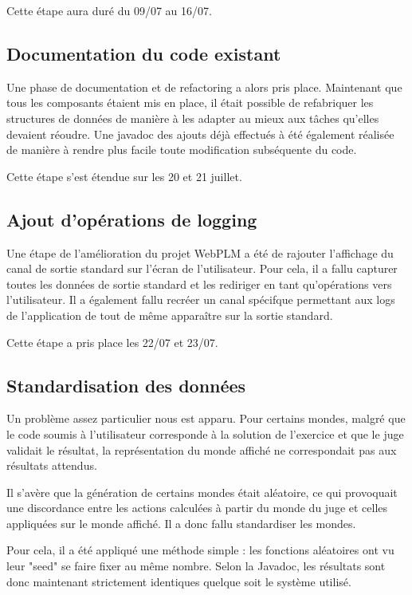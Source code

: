 \documentclass[stage]{tnreport}
\begin{document}
Cette étape aura duré du 09/07 au 16/07.

\subsection{Documentation du code existant}

Une phase de documentation et de refactoring a alors pris place. Maintenant que tous les composants étaient mis en place, il était possible de refabriquer les structures de données de manière à les adapter au mieux aux tâches qu'elles devaient réoudre.
Une javadoc des ajouts déjà effectués à été également réalisée de manière à rendre plus facile toute modification subséquente du code.

Cette étape s'est étendue sur les 20 et 21 juillet.

\subsection{Ajout d'opérations de logging}

Une étape de l'amélioration du projet WebPLM a été de rajouter l'affichage du canal de sortie standard sur l'écran de l'utilisateur. Pour cela, il a fallu capturer toutes les données de sortie standard et les rediriger en tant qu'opérations vers l'utilisateur. Il a également fallu recréer un canal spécifque permettant aux logs de l'application de tout de même apparaître sur la sortie standard.

Cette étape a pris place les 22/07 et 23/07.

\subsection{Standardisation des données}

Un problème assez particulier nous est apparu. Pour certains mondes, malgré que le code soumis à l'utilisateur corresponde à la solution de l'exercice et que le juge validait le résultat, la représentation du monde affiché ne correspondait pas aux résultats attendus.

Il s'avère que la génération de certains mondes était aléatoire, ce qui provoquait une discordance entre les actions calculées à partir du monde du juge et celles appliquées sur le monde affiché. Il a donc fallu standardiser les mondes.

Pour cela, il a été appliqué une méthode simple : les fonctions aléatoires ont vu leur "seed" se faire fixer au même nombre. Selon la Javadoc, les résultats sont donc maintenant strictement identiques quelque soit le système utilisé.
\end{document}
